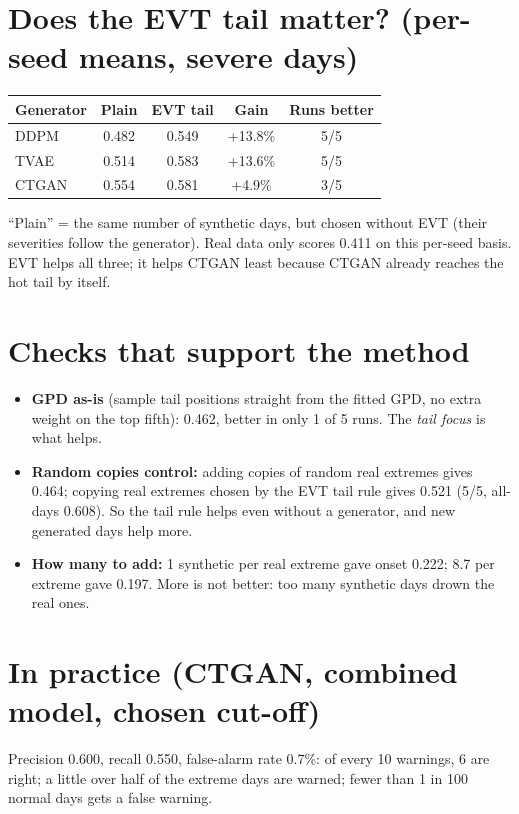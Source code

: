 \section{Does the EVT tail matter? (per-seed means, severe days)}
\begin{center}
\begin{tabular}{lcccc}
\toprule
\textbf{Generator} & \textbf{Plain} & \textbf{EVT tail} & \textbf{Gain} & \textbf{Runs better}\\
\midrule
DDPM & 0.482 & 0.549 & +13.8\% & 5/5\\
TVAE & 0.514 & 0.583 & +13.6\% & 5/5\\
CTGAN & 0.554 & 0.581 & +4.9\% & 3/5\\
\bottomrule
\end{tabular}
\end{center}
``Plain'' = the same number of synthetic days, but chosen without EVT (their severities follow the generator).
Real data only scores 0.411 on this per-seed basis. EVT helps all three; it helps CTGAN least because CTGAN already
reaches the hot tail by itself.

\section{Checks that support the method}
\begin{itemize}
  \item \textbf{GPD as-is} (sample tail positions straight from the fitted GPD, no extra weight on the top fifth):
        0.462, better in only 1 of 5 runs. The \emph{tail focus} is what helps.
  \item \textbf{Random copies control:} adding copies of random real extremes gives 0.464; copying real extremes
        chosen by the EVT tail rule gives 0.521 (5/5, all-days 0.608). So the tail rule helps even without a
        generator, and new generated days help more.
  \item \textbf{How many to add:} 1 synthetic per real extreme gave onset 0.222; 8.7 per extreme gave 0.197. More is not
        better: too many synthetic days drown the real ones.
\end{itemize}

\section{In practice (CTGAN, combined model, chosen cut-off)}
Precision 0.600, recall 0.550, false-alarm rate 0.7\%: of every 10 warnings, 6 are right; a little over half of the
extreme days are warned; fewer than 1 in 100 normal days gets a false warning.

